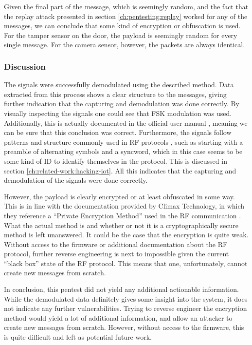 Given the final part of the message, which is seemingly random, and the fact that the replay attack presented in section \ref{ch:pentesting:replay} worked for any of the messages, we can conclude that some kind of encryption or obfuscation is used. For the tamper sensor on the door, the payload is seemingly random for every single message. For the camera sensor, however, the packets are always identical.

\subsubsection{Discussion}
The signals were successfully demodulated using the described method. Data extracted from this process shows a clear structure to the messages, giving further indication that the capturing and demodulation was done correctly. By visually inspecting the signals one could see that FSK modulation was used. Additionally, this is actually documented in the official user manual \cite{hsgw-user-manual}, meaning we can be sure that this conclusion was correct. Furthermore, the signals follow patterns and structure commonly used in RF protocols \cite{hacking-the-iot-talk}, such as starting with a preamble of alternating symbols and a syncword, which in this case seems to be some kind of ID to identify themselves in the protocol. This is discussed in section \ref{ch:related-work:hacking-iot}. All this indicates that the capturing and demodulation of the signals were done correctly.

However, the payload is clearly encrypted or at least obfuscated in some way. This is in line with the documentation provided by Climax Technology, in which they reference a \enquote{Private Encryption Method} used in the RF communication \cite{hsgw-user-manual}. What the actual method is and whether or not it is a cryptographically secure method is left unanswered. It could be the case that the encryption is quite weak. Without access to the firmware or additional documentation about the RF protocol, further reverse engineering is next to impossible given the current \enquote{black box} state of the RF protocol. This means that one, unfortunately, cannot create new messages from scratch.

In conclusion, this pentest did not yield any additional actionable information. While the demodulated data definitely gives some insight into the system, it does not indicate any further vulnerabilities. Trying to reverse engineer the encryption method would yield a lot of additional information, and allow an attacker to create new messages from scratch. However, without access to the firmware, this is quite difficult and left as potential future work.
